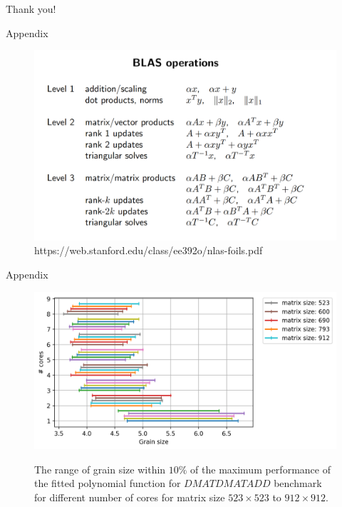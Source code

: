 \documentclass[10pt]{beamer}
\begin{document}
\begin{frame}[standout]
  Thank you!
\end{frame}

\begin{frame}{Appendix}
	\begin{outline}	
		\begin{figure}[H]
			\includegraphics[scale=.2]{images/BLAS.png}	
			\caption{{https://web.stanford.edu/class/ee392o/nlas-foils.pdf}}
			\label{fig26}		
		\end{figure} 
	\end{outline}
\end{frame}

\begin{frame}{Appendix}
	\begin{outline}	
		\begin{figure}[H]
			\includegraphics[scale=.5]{images/polyfit/fig_523-912_peak_range_all.png} \label{fig27}	\caption{The range of grain size within $10\%$ of the maximum performance of the fitted polynomial function for $DMATDMATADD$ benchmark for different number of cores for matrix size $523\times523$ to $912\times912$.}		
		\end{figure} 
	\end{outline}
\end{frame}
\end{document}
